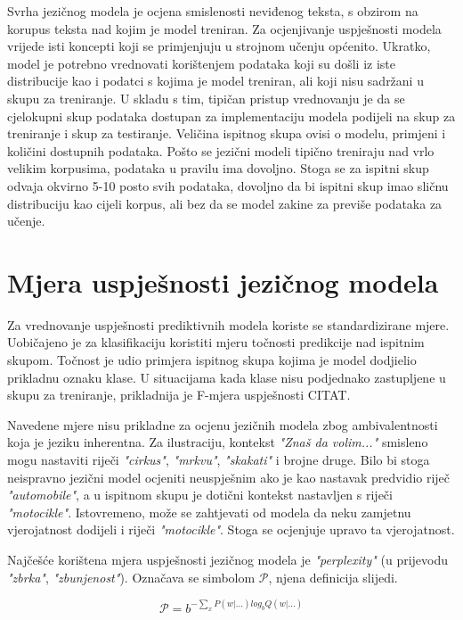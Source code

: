 \documentclass[times, utf8, diplomski, numeric]{fer}
\begin{document}
Svrha jezičnog modela je ocjena smislenosti neviđenog teksta, s obzirom na korupus teksta nad kojim je model treniran. Za ocjenjivanje uspješnosti modela vrijede isti koncepti koji se primjenjuju u strojnom učenju općenito. Ukratko, model je potrebno vrednovati korištenjem podataka koji su došli iz iste distribucije kao i podatci s kojima je model treniran, ali koji nisu sadržani u skupu za treniranje. U skladu s tim, tipičan pristup vrednovanju je da se cjelokupni skup podataka dostupan za implementaciju modela podijeli na skup za treniranje i skup za testiranje. Veličina ispitnog skupa ovisi o modelu, primjeni i količini dostupnih podataka. Pošto se jezični modeli tipično treniraju nad vrlo velikim korpusima, podataka u pravilu ima dovoljno. Stoga se za ispitni skup odvaja okvirno 5-10 posto svih podataka, dovoljno da bi ispitni skup imao sličnu distribuciju kao cijeli korpus, ali bez da se model zakine za previše podataka za učenje.

\section{Mjera uspješnosti jezičnog modela}

Za vrednovanje uspješnosti prediktivnih modela koriste se standardizirane mjere. Uobičajeno je za klasifikaciju koristiti mjeru točnosti predikcije nad ispitnim skupom. Točnost je udio primjera ispitnog skupa kojima je model dodjielio prikladnu oznaku klase. U situacijama kada klase nisu podjednako zastupljene u skupu za treniranje, prikladnija je F-mjera uspješnosti CITAT.

Navedene mjere nisu prikladne za ocjenu jezičnih modela zbog ambivalentnosti koja je jeziku inherentna. Za ilustraciju, kontekst \textit{"Znaš da volim..."} smisleno mogu nastaviti riječi \textit{"cirkus"}, \textit{"mrkvu"}, \textit{"skakati"} i brojne druge. Bilo bi stoga neispravno jezični model ocjeniti neuspješnim ako je kao nastavak predvidio riječ \textit{"automobile"}, a u ispitnom skupu je dotični kontekst nastavljen s riječi \textit{"motocikle"}. Istovremeno, može se zahtjevati od modela da neku zamjetnu vjerojatnost dodijeli i riječi \textit{"motocikle"}. Stoga se ocjenjuje upravo ta vjerojatnost.

Najčešće korištena mjera uspješnosti jezičnog modela je \textit{"perplexity"} (u prijevodu \textit{"zbrka"}, \textit{"zbunjenost"}). Označava se simbolom $\mathcal{P}$, njena definicija slijedi.

\[
\mathcal{P} = b^{- \sum_x P(w | ...) log_b Q(w | ...)}
\]
\end{document}
